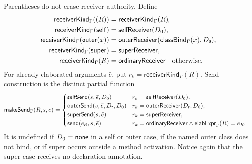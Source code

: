 Parentheses do not erase receiver authority.  Define
\begin{equation}\label{eq:surface-receiver-kind}
\begin{aligned}
 \mathsf{receiverKind}_{\Gamma}((R))&=\mathsf{receiverKind}_{\Gamma}(R),\\
 \mathsf{receiverKind}_{\Gamma}(\mathsf{self})&=\mathsf{selfReceiver}(D_0),\\
 \mathsf{receiverKind}_{\Gamma}(\mathsf{outer}(x))
   &=\mathsf{outerReceiver}(\mathsf{classBind}_{\Gamma}(x),D_0),\\
 \mathsf{receiverKind}_{\Gamma}(\mathsf{super})&=\mathsf{superReceiver},\\
 \mathsf{receiverKind}_{\Gamma}(R)&=\mathsf{ordinaryReceiver}
   \quad\text{otherwise.}
\end{aligned}
\end{equation}
For already elaborated arguments $\bar e$, put
$r_k=\mathsf{receiverKind}_{\Gamma}(R)$.  Send construction is the distinct
partial function
\begin{equation}\label{eq:elaborated-send-construction}
\begin{aligned}
 \mathsf{makeSend}_{\Gamma}(R,s,\bar e)&=
 \begin{cases}
  \mathsf{selfSend}(s,\bar e,D_0)&
    r_k=\mathsf{selfReceiver}(D_0),\\
  \mathsf{outerSend}(s,\bar e,D_t,D_0)&
    r_k=\mathsf{outerReceiver}(D_t,D_0),\\
  \mathsf{superSend}(s,\bar e)&
    r_k=\mathsf{superReceiver},\\
  \mathsf{send}(e_R,s,\bar e)&
    r_k=\mathsf{ordinaryReceiver}\land
      \mathsf{elabExpr}_{\Gamma}(R)=e_R.
 \end{cases}
\end{aligned}
\end{equation}
It is undefined if $D_0=\mathsf{none}$ in a self or outer case, if the named outer
class does not bind, or if super occurs outside a method activation.  Notice
again that the super case receives no declaration annotation.

